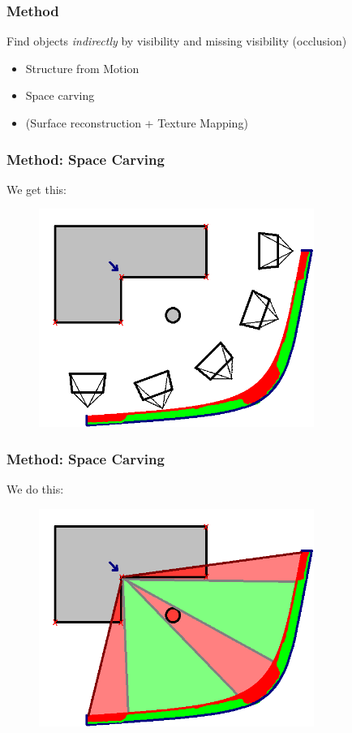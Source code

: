 \documentclass{beamer}
\begin{document}
\begin{frame}
  \frametitle{Method}
    Find objects \emph{indirectly} by visibility and missing visibility (occlusion)
    \begin{itemize}
      \item Structure from Motion
      \item Space carving
      \item (Surface reconstruction + Texture Mapping)
    \end{itemize}
\end{frame}

\begin{frame}
  \frametitle{Method: Space Carving}
  We get this:
  \begin{figure}[htb!]
   \centering
   \includegraphics[width=0.8\textwidth]{img/visibilityocclusiontrack}
  \end{figure}
\end{frame}

\begin{frame}
  \frametitle{Method: Space Carving}
  We do this:
  \begin{figure}[htb!]
   \centering
   \includegraphics[width=0.8\textwidth]{img/visibilityocclusioncarving}
  \end{figure}
\end{frame}
\end{document}
